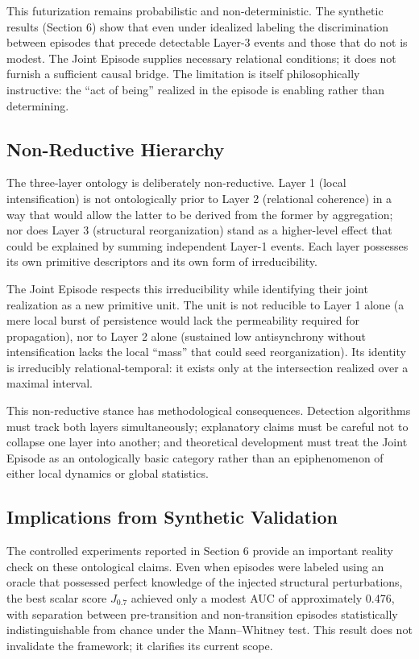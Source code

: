 This futurization remains probabilistic and non-deterministic. The synthetic results (Section 6) show that even under idealized labeling the discrimination between episodes that precede detectable Layer-3 events and those that do not is modest. The Joint Episode supplies necessary relational conditions; it does not furnish a sufficient causal bridge. The limitation is itself philosophically instructive: the ``act of being'' realized in the episode is enabling rather than determining.

\subsection{Non-Reductive Hierarchy}

The three-layer ontology is deliberately non-reductive. Layer 1 (local intensification) is not ontologically prior to Layer 2 (relational coherence) in a way that would allow the latter to be derived from the former by aggregation; nor does Layer 3 (structural reorganization) stand as a higher-level effect that could be explained by summing independent Layer-1 events. Each layer possesses its own primitive descriptors and its own form of irreducibility.

The Joint Episode respects this irreducibility while identifying their joint realization as a new primitive unit. The unit is not reducible to Layer 1 alone (a mere local burst of persistence would lack the permeability required for propagation), nor to Layer 2 alone (sustained low antisynchrony without intensification lacks the local ``mass'' that could seed reorganization). Its identity is irreducibly relational-temporal: it exists only at the intersection realized over a maximal interval.

This non-reductive stance has methodological consequences. Detection algorithms must track both layers simultaneously; explanatory claims must be careful not to collapse one layer into another; and theoretical development must treat the Joint Episode as an ontologically basic category rather than an epiphenomenon of either local dynamics or global statistics.

\subsection{Implications from Synthetic Validation}

The controlled experiments reported in Section 6 provide an important reality check on these ontological claims. Even when episodes were labeled using an oracle that possessed perfect knowledge of the injected structural perturbations, the best scalar score $J_{0.7}$ achieved only a modest AUC of approximately 0.476, with separation between pre-transition and non-transition episodes statistically indistinguishable from chance under the Mann--Whitney test. This result does not invalidate the framework; it clarifies its current scope.

